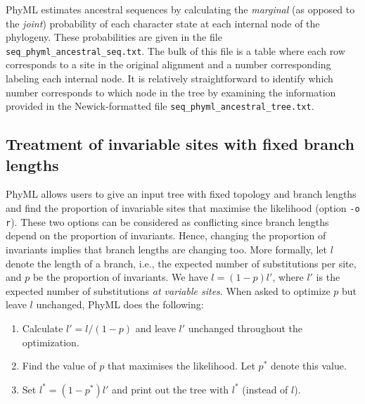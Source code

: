\documentclass[a4paper,12pt]{article}
\newcommand{\x}[1]{\texttt{#1}}
\begin{document}
PhyML estimates ancestral sequences by calculating the {\em marginal} (as opposed to the {\em joint}) probability of each character
  state at each internal node of the phylogeny. These probabilities are given in the file
\x{seq\_phyml\_ancestral\_seq.txt}. The bulk of this file is a table where each row corresponds to a
site in the original alignment and a number corresponding labeling each internal node. It is relatively
straightforward to identify which number corresponds to which node in the tree by examining the
information provided in the Newick-formatted file \x{seq\_phyml\_ancestral\_tree.txt}.


\subsection{Treatment of invariable sites with fixed branch lengths}

PhyML  allows users  to give  an input  tree with  fixed topology  and branch  lengths and  find the
proportion of invariable sites that maximise the likelihood (option \x{-o r}). These two options can
be considered  as conflicting since  branch lengths depend  on the proportion of  invariants. Hence,
changing the proportion  of invariants implies that branch lengths are  changing too. More formally,
let $l$ denote the length of a branch,  i.e., the expected number of substitutions per site, and $p$
be  the proportion  of invariants.  We have  $l =  (1-p)l'$, where  $l'$ is  the expected  number of
substitutions {\em at  variable sites}.  When  asked to optimize  $p$ but leave $l$  unchanged, PhyML
does the following:
\begin{enumerate}
\item Calculate $l' = l/(1-p)$ and leave $l'$ unchanged throughout the optimization.
\item Find the value of $p$ that maximises the likelihood. Let $p^{*}$ denote this value.
\item Set $l^{*} = (1-p^{*})l'$ and print out the tree with $l^{*}$ (instead of $l$).
\end{enumerate}
\end{document}
